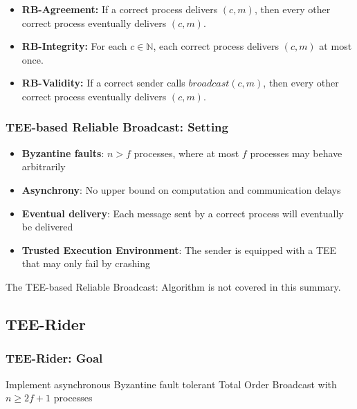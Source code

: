 \documentclass[12pt,A4]{extarticle}
\begin{document}
\begin{itemize}
  \item \textbf{RB-Agreement:} If a correct process delivers $(c, m)$, then every other correct process eventually delivers $(c, m)$.
  \item \textbf{RB-Integrity:} For each $c \in \mathbb{N}$, each correct process delivers $(c, m)$ at most once.
  \item \textbf{RB-Validity:} If a correct sender calls $\textit{broadcast}(c, m)$, then every other correct process eventually delivers $(c, m)$.
\end{itemize}

\subsubsection{TEE-based Reliable Broadcast: Setting}
\begin{itemize}
  \item \textbf{Byzantine faults}: $n > f$ processes, where at most $f$ processes may behave arbitrarily
  \item \textbf{Asynchrony}: No upper bound on computation and communication delays
  \item \textbf{Eventual delivery}: Each message sent by a correct process will eventually be delivered
  \item \textbf{Trusted Execution Environment}: The sender is equipped with a TEE that may only fail by crashing
\end{itemize}
The TEE-based Reliable Broadcast: Algorithm is not covered in this summary.


\subsection{TEE-Rider}

\subsubsection{TEE-Rider: Goal}
Implement asynchronous Byzantine fault tolerant Total Order Broadcast with $n \geq 2f + 1$ processes
\end{document}
